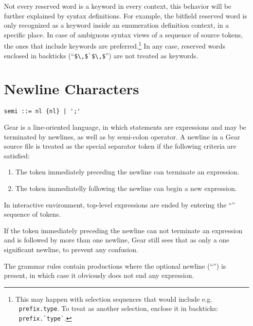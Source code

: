 Not every reserved word is a keyword in every context, this behavior will be further explained by syntax definitions. For example, the bitfield reserved word is only recognized as a keyword inside an enumeration definition context, in a specific place. In case of ambiguous syntax views of a sequence of source tokens, the ones that include keywords are preferred.\footnote{This may happen with selection sequences that would include e.g. ~\lstinline!prefix.type!. To treat  as another selection, enclose it in backticks: ~\lstinline[deletekeywords={type}]!prefix.`type`!.} In any case, reserved words enclosed in backticks (``\lstinline!$\,$`$\,$!'') are not treated as keywords. 






\section{Newline Characters}
\label{sec:newlinecharacters}

\syntax\begin{lstlisting}
semi ::= nl {nl} | ';'
\end{lstlisting}

Gear is a line-oriented language, in which statements are expressions and may be terminated by newlines, as well as by semi-colon operator. A newline in a Gear source file is treated as the special separator token \lstinline@nl@ if the following criteria are satisfied:

\begin{enumerate}
  \item The token immediately preceding the newline can terminate an expression.
  \item The token immediatelly following the newline can begin a new expression. 
\end{enumerate}

In interactive environment, top-level expressions are ended by entering the ``\code{;;}'' sequence of tokens. 

If the token immediately preceding the newline can not terminate an expression and is followed by more than one newline, Gear still sees that as only a one significant newline, to prevent any confusion.

The grammar rules contain productions where the optional newline (``\code{[nl]}'') is present, in which case it obviously does not end any expression. 





